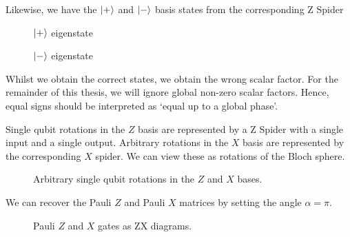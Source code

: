 Likewise, we have the $\ket +$ and $\ket -$ basis states from the corresponding Z Spider
\begin{figure}[H]
\centering
\begin{minipage}{.4\textwidth}
    \centering
    \caption{$\ket +$ eigenstate}
\end{minipage}%
\begin{minipage}{.4\textwidth}
    \centering
    \caption{$\ket -$ eigenstate}
\end{minipage}
\end{figure}

Whilst we obtain the correct states, we obtain the wrong scalar factor. For the remainder of this thesis, we will ignore global non-zero scalar factors. Hence, equal signs should be interpreted as `equal up to a global phase'.

Single qubit rotations in the $Z$ basis are represented by a Z Spider with a single input and a single output. Arbitrary rotations in the $X$ basis are represented by the corresponding $X$ spider. We can view these as rotations of the Bloch sphere.

\begin{figure}[H]
\centering
\caption{Arbitrary single qubit rotations in the $Z$ and $X$ bases.}
\end{figure}

We can recover the Pauli $Z$ and Pauli $X$ matrices by setting the angle $\alpha = \pi$.
\begin{figure}[H]
\centering
{}
\caption{Pauli $Z$ and $X$ gates as ZX diagrams.}
\end{figure}

